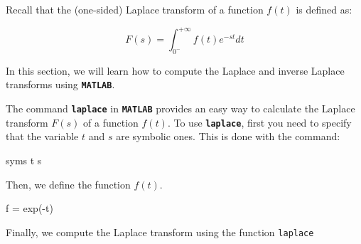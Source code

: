 \documentclass{article}
\begin{document}

\begin{par}
\begin{flushleft}
Recall that the (one-sided) Laplace transform of a function $f(t)$ is defined as:
\end{flushleft}
\end{par}

\begin{par}
$$F(s)=\int_{0^- }^{+\infty } f(t)e^{-st} dt$$
\end{par}

\begin{par}
\begin{flushleft}
In this section, we will learn how to compute the Laplace and inverse Laplace transforms using \texttt{\textbf{MATLAB}}.
\end{flushleft}
\end{par}


\begin{par}
\begin{flushleft}
The command \texttt{\textbf{laplace}} in \texttt{\textbf{MATLAB}} provides an easy way to calculate the Laplace transform $F(s)$ of a function $f(t)$. To use \texttt{\textbf{laplace}}, first you need to specify that the variable $t$ and $s$ are symbolic ones. This is done with the command:
\end{flushleft}
\end{par}

\begin{matlabcode}
syms t s
\end{matlabcode}


\begin{par}
\begin{flushleft}
Then, we define the function $f(t)$.
\end{flushleft}
\end{par}

\begin{matlabcode}
f = exp(-t)
\end{matlabcode}


\begin{par}
\begin{flushleft}
Finally, we compute the Laplace transform using the function \texttt{laplace}
\end{flushleft}
\end{par}
\end{document}
